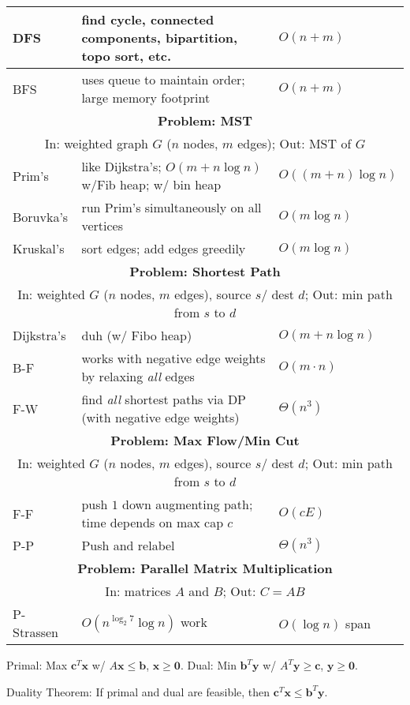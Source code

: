 \documentclass[11pt]{article}
\begin{document}
\begin{tabular}{|p{20mm} | p{100mm} | p{30mm}|}
\hline
DFS
          & find cycle, connected components, bipartition, topo sort, etc.
          & $O(n + m)$ \\
\hline
BFS
          & uses queue to maintain order; large memory footprint
          & $O(n + m)$ \\
\hline
\multicolumn{3}{|c|}{{\bf Problem: MST}} \\
\multicolumn{3}{|c|}{In: weighted graph $G$ ($n$ nodes, $m$ edges);
Out: MST of $G$} \\
\hline
Prim's
          & like Dijkstra's; $O(m + n \log n)$ w/Fib heap; w/ bin heap
          & $O((m + n )\log n)$ \\
\hline
Boruvka's
          & run Prim's simultaneously on all vertices
          & $O(m \log n)$ \\
\hline
Kruskal's
          & sort edges; add edges greedily
          & $O(m \log n)$ \\
\hline
\multicolumn{3}{|c|}{{\bf Problem: Shortest Path}} \\
\multicolumn{3}{|c|}{In: weighted $G$ ($n$ nodes, $m$ edges), source $s$/
dest $d$; Out: min path from $s$ to $d$} \\
\hline
Dijkstra's
          & duh (w/ Fibo heap)
          & $O(m + n \log n)$ \\
\hline
B-F
          & works with negative edge weights by relaxing \emph{all} edges
          & $O(m\cdot n)$ \\
\hline
F-W
          & find \emph{all} shortest paths via DP (with negative edge weights)
          & $\Theta(n^3)$ \\
\hline
\multicolumn{3}{|c|}{{\bf Problem: Max Flow/Min Cut}} \\
\multicolumn{3}{|c|}{In: weighted $G$ ($n$ nodes, $m$ edges), source $s$/
dest $d$; Out: min path from $s$ to $d$} \\
\hline
F-F
          & push $1$ down augmenting path; time depends on max cap $c$
          & $O(cE)$ \\
\hline
P-P
          & Push and relabel
          & $\Theta(n^3)$ \\
\hline
\multicolumn{3}{|c|}{{\bf Problem: Parallel Matrix Multiplication}} \\
\multicolumn{3}{|c|}{In: matrices $A$ and $B$; Out: $C = AB$} \\
\hline
P-Strassen
          & $O(n^{\log_2 7} \log n)$ work
          & $O(\log n)$ span \\
\hline
\end{tabular}

Primal: Max $\mathbf{c}^T\mathbf{x}$ w/
$A\mathbf{x} \leq \mathbf{b}$, $\mathbf{x} \geq \mathbf{0}$.
Dual: Min $\mathbf{b}^T\mathbf{y}$ w/
$A^T\mathbf{y} \geq \mathbf{c}$, $\mathbf{y} \geq \mathbf{0}$.

Duality Theorem: If primal and dual are feasible, then
$\mathbf{c}^T\mathbf{x} \leq \mathbf{b}^T\mathbf{y}$.
\end{document}
